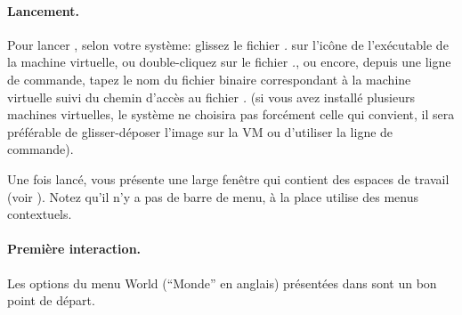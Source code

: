 \documentclass[a4paper,10pt,twoside]{book}
\begin{document}

\paragraph{Lancement.} Pour lancer \sq, selon votre système: glissez
le fichier \emph{.} sur l'icône de l'exécutable de la
machine virtuelle, ou double-cliquez sur le fichier
\emph{.}, ou encore, depuis une ligne de commande,
tapez le nom du fichier binaire correspondant \`a la machine virtuelle
suivi du chemin d'accès au fichier \emph{.} (si vous
avez installé plusieurs machines virtuelles, le système ne choisira
pas forcément celle qui convient, il sera préférable de
glisser-déposer l'image sur la VM ou d'utiliser la ligne de commande).

Une fois lancé, \sq vous présente une large fenêtre qui contient des espaces de travail (voir ). Notez qu'il n'y a pas de barre de menu, à la place \sq utilise des menus contextuels. 


\paragraph{Première interaction.}

Les options du menu World (``Monde'' en anglais) pr\'esent\'ees dans
 sont un bon point de d\'epart.

\end{document}

